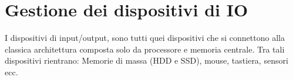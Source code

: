 \chapter{Gestione dei dispositivi di IO}
I dispositivi di input/output, sono tutti quei dispositivi che si connettono alla classica architettura composta solo da processore e memoria centrale. Tra tali dispositivi rientrano: Memorie di massa (HDD e SSD), mouse, tastiera, sensori ecc.


\clearpage

\clearpage

\clearpage